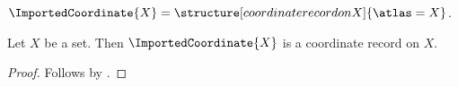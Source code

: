 

\begin{definition}\label{imported_coordinate_base}
    $\ImportedCoordinate{X}=\structure[coordinate record on X]{\atlas=X}$.
\end{definition}

\begin{classification}\label{imported_coordinate_result}
    Let $X$ be a set.
    Then $\ImportedCoordinate{X}$ is a coordinate record on $X$.
\end{classification}
\begin{proof}
    Follows by .
\end{proof}
